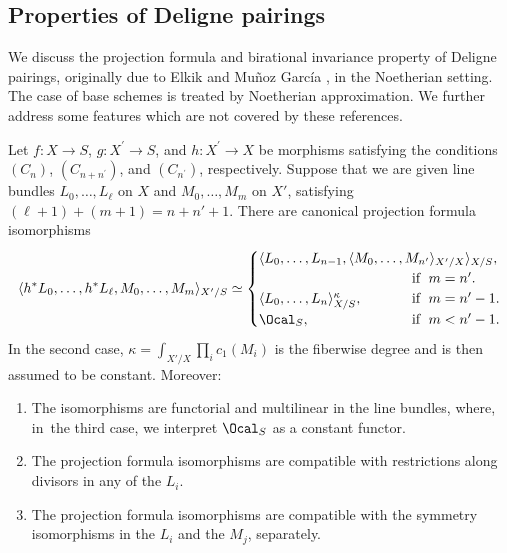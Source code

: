 \subsection{Properties of Deligne pairings}
We discuss the projection formula and birational invariance property of Deligne pairings, originally due to Elkik \cite{Elkikfib} and Muñoz García \cite{Munoz}, in the Noetherian setting. The case of base schemes is treated by Noetherian approximation. We further address some features which are not covered by these references.

\begin{proposition}\label{prop:projformuladeli}
Let $f\colon X\!\to\! S$, $g\colon X^{\prime}\!\to\! S$, and \hbox{$h\colon X^{\prime}\!\to\! X$} be morphisms satisfying the conditions $(C_{n})$, $(C_{n+n^{\prime}})$, and $(C_{n^{\prime}})$, respectively. Suppose that we are given line bundles $L_0, \ldots, L_\ell$ on $X$ and $M_{0}, \ldots, M_{m}$ on $X'$, satisfying $(\ell+1)+(m+1)=n+n'+1$. There are canonical projection formula isomorphisms
\begin{displaymath}
\langle h^\ast L_0, \ldots, h^\ast L_\ell, M_{0}, \ldots, M_{m} \rangle_{X'/S} \simeq
\begin{cases}
\langle L_0, \ldots, L_{n-1}, \langle M_{0}, \ldots, M_{n'} \rangle_{X'/X} \rangle_{X/S},\\
& \hspace*{-2.5cm}\text{if }\; m = n'.\\
\langle L_0, \ldots, L_{n} \rangle_{X/S}^{\kappa},
& \hspace*{-2.5cm}\text{if }\; m= n'-1.\\
\Ocal_S, & \hspace*{-2.5cm}\text{if }\; m < n'-1.
\end{cases}
\end{displaymath}
In the second case, $\kappa = \int_{X'/X} \prod_{i} c_1(M_i)$ is the fiberwise degree and is then assumed to be constant. Moreover:
\begin{enumerate}
\item The isomorphisms are functorial and multilinear in the line bundles, where, in~the third case, we interpret $\Ocal_S$ as a constant functor.
\item The projection formula isomorphisms are compatible with restrictions along divisors in any of the $L_i$.
\item The projection formula isomorphisms are compatible with the symmetry isomorphisms in the $L_{i}$ and the $M_{j}$, separately.
\end{enumerate}
\end{proposition}

